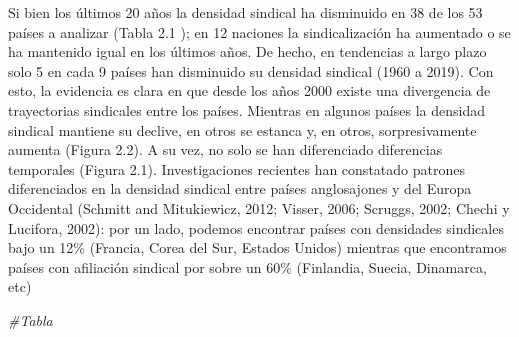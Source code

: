 \documentclass[
]{book}
\newenvironment{Shaded}{\begin{snugshade}}{\end{snugshade}}
\newcommand{\CommentTok}[1]{\textcolor[rgb]{0.56,0.35,0.01}{\textit{#1}}}
\begin{document}
Si bien los últimos 20 años la densidad sindical ha disminuido en 38 de los 53 países a analizar (Tabla 2.1 ); en 12 naciones la sindicalización ha aumentado o se ha mantenido igual en los últimos años. De hecho, en tendencias a largo plazo solo 5 en cada 9 países han disminuido su densidad sindical (1960 a 2019). Con esto, la evidencia es clara en que desde los años 2000 existe una divergencia de trayectorias sindicales entre los países. Mientras en algunos países la densidad sindical mantiene su declive, en otros se estanca y, en otros, sorpresivamente aumenta (Figura 2.2). A su vez, no solo se han diferenciado diferencias temporales (Figura 2.1). Investigaciones recientes han constatado patrones diferenciados en la densidad sindical entre países anglosajones y del Europa Occidental (Schmitt and Mitukiewicz, 2012; Visser, 2006; Scruggs, 2002; Chechi y Lucifora, 2002): por un lado, podemos encontrar países con densidades sindicales bajo un 12\% (Francia, Corea del Sur, Estados Unidos) mientras que encontramos países con afiliación sindical por sobre un 60\% (Finlandia, Suecia, Dinamarca, etc)

\begin{Shaded}
\begin{Highlighting}[]
\CommentTok{#Tabla}
\end{Highlighting}
\end{Shaded}
\end{document}
